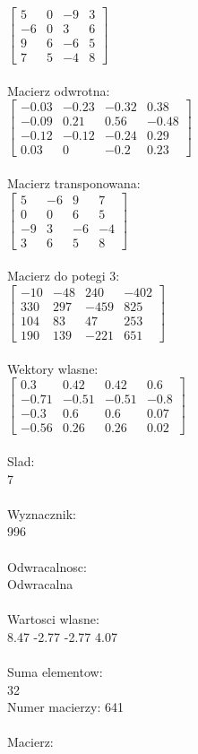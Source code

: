 \documentclass[a4paper,12pt]{article}
\begin{document}
$\begin{bmatrix} 5&0&-9&3\\-6&0&3&6\\9&6&-6&5\\7&5&-4&8 \end{bmatrix}$
\\
\\
Macierz odwrotna:\\

$\begin{bmatrix} -0.03&-0.23&-0.32&0.38\\-0.09&0.21&0.56&-0.48\\-0.12&-0.12&-0.24&0.29\\0.03&0&-0.2&0.23 \end{bmatrix}$
\\
\\
Macierz transponowana:\\

$\begin{bmatrix} 5&-6&9&7\\0&0&6&5\\-9&3&-6&-4\\3&6&5&8 \end{bmatrix}$
\\
\\
Macierz do potegi 3:\\

$\begin{bmatrix} -10&-48&240&-402\\330&297&-459&825\\104&83&47&253\\190&139&-221&651 \end{bmatrix}$
\\
\\
Wektory wlasne:\\

$\begin{bmatrix} 0.3&0.42&0.42&0.6\\-0.71&-0.51&-0.51&-0.8\\-0.3&0.6&0.6&0.07\\-0.56&0.26&0.26&0.02 \end{bmatrix}$
\\
\\
Slad:\\
7
\\
\\
Wyznacznik:\\
996
\\
\\
Odwracalnosc:\\
Odwracalna
\\
\\
Wartosci wlasne:\\
8.47 -2.77 -2.77 4.07
\\
\\
Suma elementow:\\
32
\\
\newpage
Numer macierzy:
641
\\
\\
Macierz:\\
\end{document}

